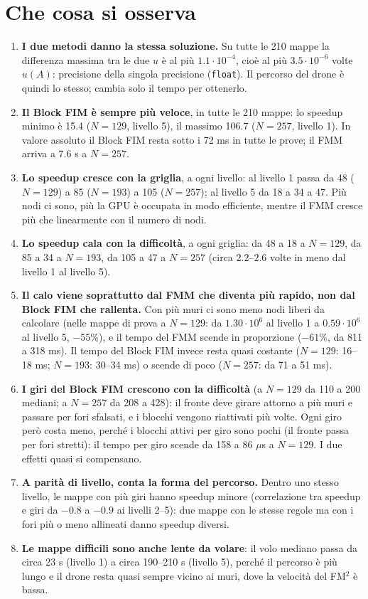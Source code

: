 \documentclass[11pt,a4paper]{article}
\begin{document}
\section{Che cosa si osserva}
\begin{enumerate}
  \item \textbf{I due metodi danno la stessa soluzione.} Su tutte le 210 mappe la differenza massima tra le due $u$ è al più $1.1\cdot10^{-4}$, cioè al più $3.5\cdot10^{-6}$ volte $u(A)$: precisione della singola precisione (\texttt{float}). Il percorso del drone è quindi lo stesso; cambia solo il tempo per ottenerlo.
  \item \textbf{Il Block FIM è sempre più veloce}, in tutte le 210 mappe: lo speedup minimo è 15.4 ($N=129$, livello 5), il massimo 106.7 ($N=257$, livello 1). In valore assoluto il Block FIM resta sotto i 72 ms in tutte le prove; il FMM arriva a 7.6 s a $N=257$.
  \item \textbf{Lo speedup cresce con la griglia}, a ogni livello: al livello 1 passa da 48 ($N=129$) a 85 ($N=193$) a 105 ($N=257$); al livello 5 da 18 a 34 a 47. Più nodi ci sono, più la GPU è occupata in modo efficiente, mentre il FMM cresce più che linearmente con il numero di nodi.
  \item \textbf{Lo speedup cala con la difficoltà}, a ogni griglia: da 48 a 18 a $N=129$, da 85 a 34 a $N=193$, da 105 a 47 a $N=257$ (circa $2.2$--$2.6$ volte in meno dal livello 1 al livello 5).
  \item \textbf{Il calo viene soprattutto dal FMM che diventa più rapido, non dal Block FIM che rallenta.} Con più muri ci sono meno nodi liberi da calcolare (nelle mappe di prova a $N=129$: da $1.30\cdot10^6$ al livello 1 a $0.59\cdot10^6$ al livello 5, $-55\%$), e il tempo del FMM scende in proporzione ($-61\%$, da 811 a 318 ms). Il tempo del Block FIM invece resta quasi costante ($N=129$: 16--18 ms; $N=193$: 30--34 ms) o scende di poco ($N=257$: da 71 a 51 ms).
  \item \textbf{I giri del Block FIM crescono con la difficoltà} (a $N=129$ da 110 a 200 mediani; a $N=257$ da 208 a 428): il fronte deve girare attorno a più muri e passare per fori sfalsati, e i blocchi vengono riattivati più volte. Ogni giro però costa meno, perché i blocchi attivi per giro sono pochi (il fronte passa per fori stretti): il tempo per giro scende da 158 a 86 $\mu$s a $N=129$. I due effetti quasi si compensano.
  \item \textbf{A parità di livello, conta la forma del percorso.} Dentro uno stesso livello, le mappe con più giri hanno speedup minore (correlazione tra speedup e giri da $-0.8$ a $-0.9$ ai livelli 2--5): due mappe con le stesse regole ma con i fori più o meno allineati danno speedup diversi.
  \item \textbf{Le mappe difficili sono anche lente da volare}: il volo mediano passa da circa 23 s (livello 1) a circa 190--210 s (livello 5), perché il percorso è più lungo e il drone resta quasi sempre vicino ai muri, dove la velocità del FM$^2$ è bassa.
\end{enumerate}
\end{document}
